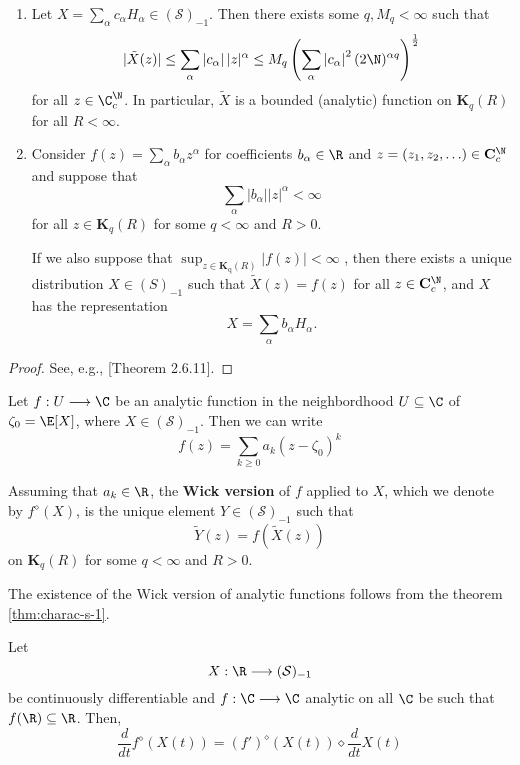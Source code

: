 \begin{theorem}\label{thm:charac-s-1} \hfill

\begin{enumerate}
\item Let $X=\sum_\alpha c_\alpha H_\alpha \in(\mathcal{S})_{-1}$. Then there exists some $q, M_q<\infty$ such that
\[
|\tilde{X}(z)| \leq \sum_\alpha\left|c_\alpha\right||z|^\alpha \leq M_q\left(\sum_\alpha\left|c_\alpha\right|^2(2 \N)^{\alpha q}\right)^{\frac{1}{2}}
\]
for all $z \in \C_c^{\N}$. In particular, $\tilde{X}$ is a bounded (analytic) function on $\mathbf{K}_q(R)$ for all $R<\infty$.

\item Consider
$
f(z)=\sum_\alpha b_\alpha z^\alpha
$
for coefficients $b_\alpha \in \R$ and $z=(z_1, z_2, \ldots ) \in \mathbf{C}_c^{\N}$ and suppose that 
\[
\sum_\alpha\left|b_\alpha\right||z|^\alpha<\infty
\]
for all $z \in \mathbf{K}_q(R)$ for some $q<\infty$ and $R>0$.

If we also suppose that 
$
\sup _{z \in \mathbf{K}_{\mathrm{q}}(R)}|f(z)|<\infty
$
, then there exists a unique distribution $X \in (S)_{-1}$ such that
$
\tilde{X}(z)=f(z)
$
for all $z \in \mathbf{C}_c^{\N}$, and $X$ has the representation
\[
X=\sum_\alpha b_\alpha H_\alpha .
\]
\end{enumerate}
\end{theorem}

\begin{proof}
See, e.g., \cite{holden1996stochastic}[Theorem 2.6.11].
\end{proof}

\begin{definition}
Let $ f : U \longrightarrow \C$ be an analytic function in the neighbordhood $U \subseteq \C$ of $\zeta_0 = \E [X]$, where $X \in (\mathcal{S})_{-1}$. Then we can write
\[
f(z) = \sum_{k \ge 0} a_k (z - \zeta_0)^k
\]

Assuming that $a_k \in \R$, the \textbf{Wick version} of $f$ applied to $X$, which we denote by $f^\diamond(X)$, is the unique element $Y \in (\mathcal{S})_{-1}$ such that 
\[
\widetilde{Y}(z) = f(\widetilde{X}(z))
\]
on $\mathbf{K}_q(R)$ for some $q < \infty$ and $R > 0$.
\end{definition}

The existence of the Wick version of analytic functions follows from the theorem \ref{thm:charac-s-1}.

\begin{theorem}
Let 
\[
X : \R \longrightarrow (\mathcal{S})_{-1}
\]
be continuously differentiable and $f : \C \longrightarrow \C$ analytic on all $\C$ be such that $f(\R) \subseteq \R$. Then, 
\[
\frac{d}{dt} f^\diamond(X(t)) = (f')^\diamond(X(t)) \diamond \frac{d}{dt} X(t)
\]
\end{theorem}

